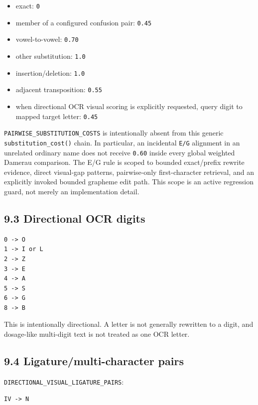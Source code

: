 \begin{itemize}
\tightlist
\item
  exact: \texttt{0}
\item
  member of a configured confusion pair: \texttt{0.45}
\item
  vowel-to-vowel: \texttt{0.70}
\item
  other substitution: \texttt{1.0}
\item
  insertion/deletion: \texttt{1.0}
\item
  adjacent transposition: \texttt{0.55}
\item
  when directional OCR visual scoring is explicitly requested, query digit to mapped target letter: \texttt{0.45}
\end{itemize}

\texttt{PAIRWISE\_\allowbreak{}SUBSTITUTION\_\allowbreak{}COSTS} is intentionally absent from this generic \texttt{substitution\_\allowbreak{}cost()} chain. In particular, an incidental \texttt{E/G} alignment in an unrelated ordinary name does not receive \texttt{0.60} inside every global weighted Damerau comparison. The E/G rule is scoped to bounded exact/prefix rewrite evidence, direct visual-gap patterns, pairwise-only first-character retrieval, and an explicitly invoked bounded grapheme edit path. This scope is an active regression guard, not merely an implementation detail.

\subsection{9.3 Directional OCR digits}\label{93-directional-ocr-digits}

\begin{verbatim}
0 -> O
1 -> I or L
2 -> Z
3 -> E
4 -> A
5 -> S
6 -> G
8 -> B
\end{verbatim}

This is intentionally directional. A letter is not generally rewritten to a digit, and dosage-like multi-digit text is not treated as one OCR letter.

\subsection{9.4 Ligature/multi-character pairs}\label{94-ligaturemulti-character-pairs}

\texttt{DIRECTIONAL\_\allowbreak{}VISUAL\_\allowbreak{}LIGATURE\_\allowbreak{}PAIRS}:

\begin{verbatim}
IV -> N
\end{verbatim}


